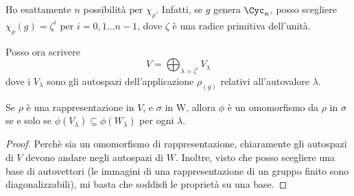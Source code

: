 	\begin{myexample}
		Ho esattamente $n$ possibilità per $\chi_\rho$. Infatti, se $g$ genera $\Cyc_n$, posso scegliere $\chi_\rho(g)=\zeta^i$ per $i=0,1\dots n-1$, dove $\zeta$ è una radice primitiva dell'unità.
		
		Posso ora scrivere
		\[
			V=\bigoplus_{\lambda=\zeta^i}V_\lambda
		\]
		dove i $V_\lambda$ sono gli autospazi dell'applicazione $\rho_(g)$ relativi all'autovalore $\lambda$.
		
		Se $\rho$ è una rappresentazione in $V$, e $\sigma$ in W, allora $\phi$ è un omomorfismo da $\rho$ in $\sigma$ se e solo se $\phi(V_\lambda)\subseteq \phi(W_\lambda)$ per ogni $\lambda$.
		
		\begin{proof}
			Perchè sia un omomorfismo di rappresentazione, chiaramente gli autospazi di $V$ devono andare negli autospazi di $W$. Inoltre, visto che posso scegliere una base di autovettori (le immagini di una rappresentazione di un gruppo finito sono diagonalizzabili), mi basta che soddisfi le proprietà su una base.
		\end{proof}


	\end{myexample}
